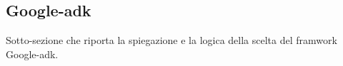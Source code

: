 \subsection{Google-adk}

Sotto-sezione che riporta la spiegazione e la logica della scelta del framwork Google-adk.